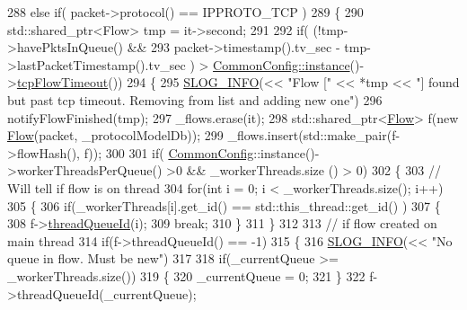 \begin{DoxyCode}
288         \textcolor{keywordflow}{else} \textcolor{keywordflow}{if}( packet->protocol() == IPPROTO\_TCP )
289         \{
290             std::shared\_ptr<Flow> tmp = it->second;
291             
292             \textcolor{keywordflow}{if}( (!tmp->havePktsInQueue() &&
293                     packet->timestamp().tv\_sec - tmp->lastPacketTimestamp().tv\_sec ) > 
      \hyperlink{class_vsid_common_1_1_common_config_a69c29458a786be527fe66470ac9fbbdb}{CommonConfig::instance}()->\hyperlink{class_vsid_common_1_1_common_config_af2130266e27cc2b8cf135e4ba499aaa5}{tcpFlowTimeout}())
294             \{
295                 \hyperlink{_logger_8h_a119c1c29ba35a8db38e2358e41167282}{SLOG\_INFO}(<< \textcolor{stringliteral}{"Flow ["} << *tmp << \textcolor{stringliteral}{"] found but past tcp timeout. Removing from list
       and adding new one"})
296                 notifyFlowFinished(tmp);
297                 \_flows.erase(it);
298                 std::shared\_ptr<\hyperlink{class_vsid_common_1_1_flow}{Flow}>  f(new \hyperlink{class_vsid_common_1_1_flow}{Flow}(packet, \_protocolModelDb));
299                 \_flows.insert(std::make\_pair(f->flowHash(), f));
300 
301                 if( \hyperlink{class_vsid_common_1_1_common_config}{CommonConfig}::instance()->workerThreadsPerQueue() >0 && \_workerThreads.size
      () > 0)
302                 \{
303                     \textcolor{comment}{// Will tell if flow is on thread}
304                     \textcolor{keywordflow}{for}(\textcolor{keywordtype}{int} i = 0; i < \_workerThreads.size(); i++)
305                     \{
306                         \textcolor{keywordflow}{if}(\_workerThreads[i].get\_id() == std::this\_thread::get\_id() )
307                         \{
308                             f->\hyperlink{class_vsid_common_1_1_flow_a067c4a0fbf63c7295442c54898d9990d}{threadQueueId}(i);
309                             \textcolor{keywordflow}{break};
310                         \}
311                     \}
312 
313                     \textcolor{comment}{// if flow created on main thread}
314                     \textcolor{keywordflow}{if}(f->threadQueueId() == -1)
315                     \{
316                         \hyperlink{_logger_8h_a119c1c29ba35a8db38e2358e41167282}{SLOG\_INFO}(<< \textcolor{stringliteral}{"No queue in flow. Must be new"})
317                         
318                         if(\_currentQueue >= \_workerThreads.size())
319                         \{
320                             \_currentQueue = 0;
321                         \}
322                         f->threadQueueId(\_currentQueue);

\end{DoxyCode}
